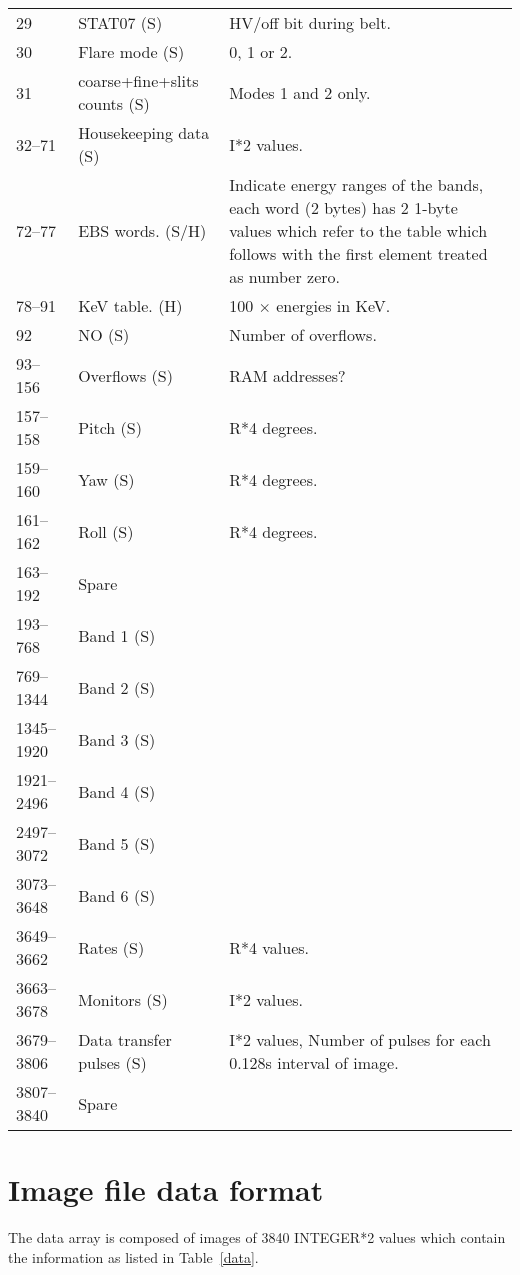 \begin{table}
\begin{center}
{\begin{tabular}{|llp{75mm}|}
29 & STAT07 \hfill (S) & HV/off bit during belt.\\
30 & Flare mode \hfill(S) & 0, 1 or 2.\\
31 & coarse+fine+slits counts \hfill(S) & Modes 1 and 2 only.\\
32--71 & Housekeeping data \hfill(S) & I*2 values.\\
72--77 & EBS words. \hfill(S/H) & Indicate energy ranges of the bands, each word
(2 bytes) has 2 1-byte values which refer to the table which follows 
with the first element treated as number zero.\\
78--91 & KeV table. \hfill(H) & 100 $\times$ energies in KeV.\\
92 & NO \hfill(S) & Number of overflows.\\
93--156 & Overflows \hfill(S) & RAM addresses? \\
157--158 & Pitch \hfill(S) & R*4 degrees.\\
159--160 & Yaw \hfill(S) & R*4 degrees.\\
161--162 & Roll \hfill(S) & R*4 degrees.\\
163--192 & Spare & \\
193--768 & Band 1 \hfill(S) & \\
769--1344 & Band 2 \hfill(S) & \\
1345--1920 & Band 3 \hfill(S) & \\
1921--2496 & Band 4 \hfill(S) & \\
2497--3072 & Band 5 \hfill(S) & \\
3073--3648 & Band 6 \hfill(S) & \\
3649--3662 & Rates \hfill(S) & R*4 values.\\
3663--3678 & Monitors \hfill(S) & I*2 values.\\
3679--3806 & Data transfer pulses \hfill(S) & I*2 values, Number of pulses
for each 0.128s interval of image.\\
3807--3840 & Spare & \\
\hline
\end{tabular}}
\end{center}
\end{table}

\section{Image file data format}
\label{DATA}

The data array is composed of images of 3840 INTEGER*2 values which
contain the information as listed in Table~\ref{data}.

